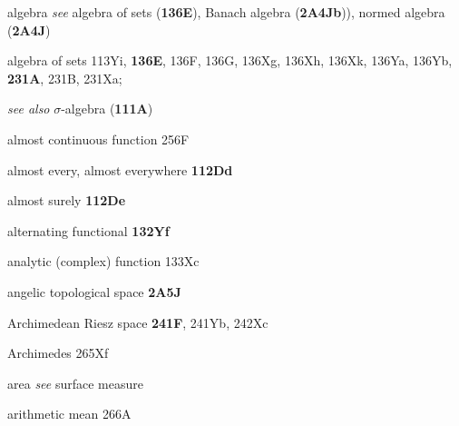 algebra
  {\it see} algebra of sets ({\bf 136E}),
Banach algebra ({\bf 2A4Jb})),
normed algebra ({\bf 2A4J})


algebra of sets 113Yi, {\bf 136E}, 136F, 136G, 136Xg, 136Xh,
136Xk, 136Ya, 136Yb,
  {\bf 231A}, 231B, 231Xa;  

  {\it see also }
$\sigma$-algebra ({\bf 111A})






almost continuous function 256F







almost every, almost everywhere {\bf 112Dd}








almost surely {\bf 112De}

alternating functional {\bf 132Yf}
















analytic (complex) function 133Xc



angelic topological space {\bf 2A5J}














Archimedean Riesz space {\bf 241F}, 241Yb, 242Xc



Archimedes 265Xf


area {\it see} surface measure





arithmetic mean 266A
















